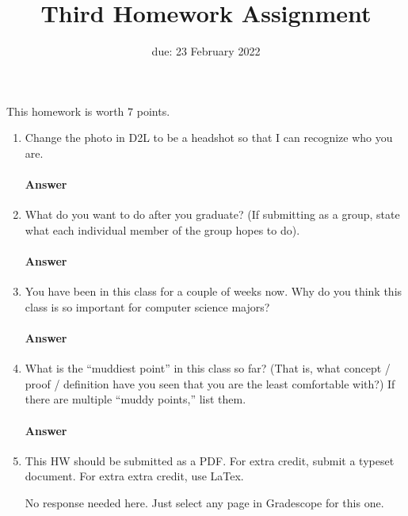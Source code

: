 \renewcommand{\hwnum}{3}

\title{Third Homework Assignment}
\author{\todo{}}
\date{due: 23 February 2022}
\maketitle

This homework is worth $7$ points.



\begin{enumerate}

    \item Change the photo in D2L to be a headshot so that I can recognize who you are.
        \paragraph{Answer}

    \item What do you want to do after you graduate? (If submitting as a group,
        state what each individual member of the group hopes to do).
        \paragraph{Answer}
        \todo{}

    \item You have been in this class for a couple of weeks now.  Why do you
        think this class is so important for computer science majors?
        \paragraph{Answer}
        \todo{}

    \item What is the ``muddiest point'' in this class so far?  (That is, what
        concept / proof / definition have you seen that you are the least
        comfortable with?)  If there are multiple ``muddy points,'' list them.
        \paragraph{Answer}
        \todo{}

    \item This HW should be submitted as a PDF.
        For extra credit, submit a typeset document. For extra extra credit,
        use LaTex.

        No response needed here. Just select any page in Gradescope
        for this one.

\end{enumerate}

